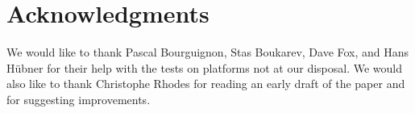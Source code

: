 \section{Acknowledgments} 

We would like to thank Pascal Bourguignon, Stas Boukarev, Dave Fox,
and Hans Hübner for their help with the tests on platforms not at our
disposal.  We would also like to thank Christophe Rhodes for reading
an early draft of the paper and for suggesting improvements.


